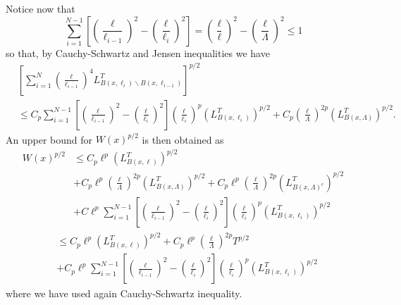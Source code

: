 \documentclass[a4paper,12pt]{article}
\begin{document}
Notice now that
\[
\sum_{i=1}^{N-1}\left[  \left(  \frac{\ell}{\ell_{i-1}}\right)  ^{2}-\left(
\frac{\ell}{\ell_{i}}\right)  ^{2}\right]  =\left(  \frac{\ell}{\ell}\right)
^{2}-\left(  \frac{\ell}{\Lambda}\right)  ^{2}\leq1
\]
so that, by Cauchy-Schwartz and Jensen inequalities we have
\begin{align*}
&  \left[  \sum_{i=1}^{N}\left(  \frac{\ell}{\ell_{i-1}}\right)
^{4}L_{B(x,\ell_{i})\backslash B(x,\ell_{i-1})}^{T}\right]  ^{p/2}\\
&  \leq C_{p}\sum_{i=1}^{N-1}\left[  \left(  \frac{\ell}{\ell_{i-1}}\right)
^{2}-\left(  \frac{\ell}{\ell_{i}}\right)  ^{2}\right]  \left(  \frac{\ell
}{\ell_{i}}\right)  ^{p}(L_{B(x,\ell_{i})}^{T})^{p/2}+C_{p}\left(  \frac{\ell
}{\Lambda}\right)  ^{2p}\left(  L_{B(x,\Lambda)}^{T}\right)  ^{p/2}.
\end{align*}
An upper bound for $W(x)^{p/2}$ is then obtained as
\begin{align*}
W(x)^{p/2}  &  \leq C_{p}\ell^{p}(L_{B(x,\ell)}^{T})^{p/2}\\
&  +C_{p}\ell^{p}\left(  \frac{\ell}{\Lambda}\right)  ^{2p}\left(
L_{B(x,\Lambda)}^{T}\right)  ^{p/2}+C_{p}\ell^{p}\left(  \frac{\ell}{\Lambda
}\right)  ^{2p}\left(  L_{B(x,\Lambda)^{c}}^{T}\right)  ^{p/2}\\
&  +C\ell^{p}\sum_{i=1}^{N-1}\left[  \left(  \frac{\ell}{\ell_{i-1}}\right)
^{2}-\left(  \frac{\ell}{\ell_{i}}\right)  ^{2}\right]  \left(  \frac{\ell
}{\ell_{i}}\right)  ^{p}(L_{B(x,\ell_{i})}^{T})^{p/2}%
\end{align*}%
\begin{align*}
&  \leq C_{p}\ell^{p}(L_{B(x,\ell)}^{T})^{p/2}+C_{p}\ell^{p}\left(  \frac
{\ell}{\Lambda}\right)  ^{2p}T^{p/2}\\
&  +C_{p}\ell^{p}\sum_{i=1}^{N-1}\left[  \left(  \frac{\ell}{\ell_{i-1}%
}\right)  ^{2}-\left(  \frac{\ell}{\ell_{i}}\right)  ^{2}\right]  \left(
\frac{\ell}{\ell_{i}}\right)  ^{p}(L_{B(x,\ell_{i})}^{T})^{p/2}%
\end{align*}
where we have used again Cauchy-Schwartz inequality.
\end{document}
